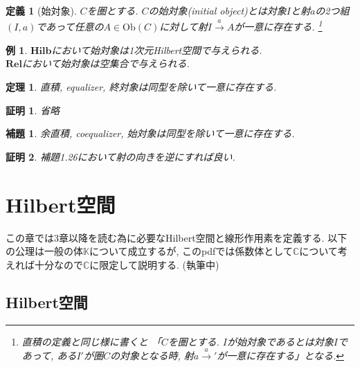 \documentclass[a4paper,12pt]{ltjsarticle}
\theoremstyle{break}
\newtheorem{defn}[thm]{定義}
\newtheorem{eg}[thm]{例}
\newtheorem{thrm}[thm]{定理}
\newtheorem{lem}[thm]{補題}
\newtheorem*{prf}{証明}
\newcommand{\rel}{\mathbf{Rel}}
\newcommand{\hilb}{\mathbf{Hilb}}
\newcommand{\mbc}{\mathbb{C}}
\newcommand{\Ob}{\mathrm{Ob}}
\newcommand{\xr}[1]{\xrightarrow{#1}}
\numberwithin{equation}{section}
\begin{document}
\begin{defn}[始対象]
  $C$を圏とする. 
  $C$の始対象(initial object)とは対象$I$と射$a$の2つ組$(I,a)$であって任意の$A \in \Ob(C)$に対して射$I \xr{a} A$が一意に存在する.
  \footnote{
  直積の定義と同じ様に書くと 「$C$を圏とする. 
  $I$が始対象であるとは対象$I$であって, ある$I'$が圏$C$の対象となる時, 射$a \xr a'$が一意に存在する」となる. 
  } 
\end{defn}

\begin{eg}
  $\hilb$において始対象は1次元Hilbert空間で与えられる. \\
  $\rel$において始対象は空集合で与えられる. 
\end{eg}

\begin{thrm}
  直積, equalizer, 終対象は同型を除いて一意に存在する. 
\end{thrm}

\begin{prf}
  省略
\end{prf}

\begin{lem}
  余直積, coequalizer, 始対象は同型を除いて一意に存在する. 
\end{lem}  

\begin{prf}
  補題1.26において射の向きを逆にすれば良い. 
\end{prf}

\newpage

\section{Hilbert空間}

この章では3章以降を読む為に必要なHilbert空間と線形作用素を定義する. 
以下の公理は一般の体$\mathbb{K}$について成立するが, このpdfでは係数体として$\mbc$について考えれば十分なので$\mbc$に限定して説明する.
(執筆中)

\subsection{Hilbert空間}
\end{document}
